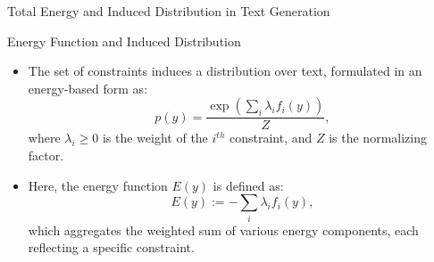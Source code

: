 \documentclass{beamer}
\begin{document}
\begin{frame}{Total Energy and Induced Distribution in Text Generation}
    \begin{block}{Energy Function and Induced Distribution}
        \begin{itemize}
            \item The set of constraints induces a distribution over text, formulated in an energy-based form as:
                  \begin{equation*}
                      p(y) = \frac{\exp\left( \sum_{i} \lambda_{i}f_{i}(y) \right)}{Z},
                  \end{equation*}
                  where $\lambda_{i} \geq 0$ is the weight of the $i^{th}$ constraint, and $Z$ is the normalizing factor.

            \item Here, the energy function $E(y)$ is defined as:
                  \begin{equation*}
                      E(y) := -\sum_{i} \lambda_{i}f_{i}(y),
                  \end{equation*}
                  which aggregates the weighted sum of various energy components, each reflecting a specific constraint.
        \end{itemize}
    \end{block}

\end{frame}
\end{document}
